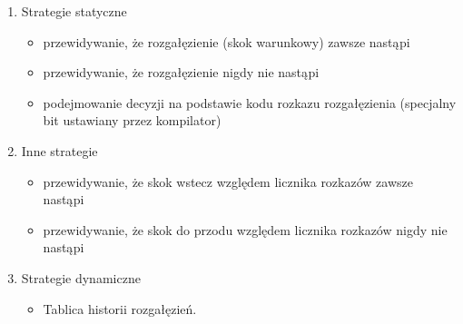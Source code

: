 	   	\begin{enumerate}
	   		\item Strategie statyczne
	   		\begin{itemize}
	   			\item przewidywanie, że rozgałęzienie (skok warunkowy) zawsze nastąpi
	   			\item przewidywanie, że rozgałęzienie nigdy nie nastąpi
	   			\item podejmowanie decyzji na podstawie kodu rozkazu rozgałęzienia (specjalny bit ustawiany przez kompilator)
	   		\end{itemize}
	   		\item Inne strategie
	   		\begin{itemize}
	   			\item przewidywanie, że skok wstecz względem licznika rozkazów zawsze nastąpi
	   			\item przewidywanie, że skok do przodu względem licznika rozkazów nigdy nie nastąpi
	   		\end{itemize}
	   		\item Strategie dynamiczne
	   		\begin{itemize}
	   			\item Tablica historii rozgałęzień.
	   		\end{itemize}

\end{enumerate}
